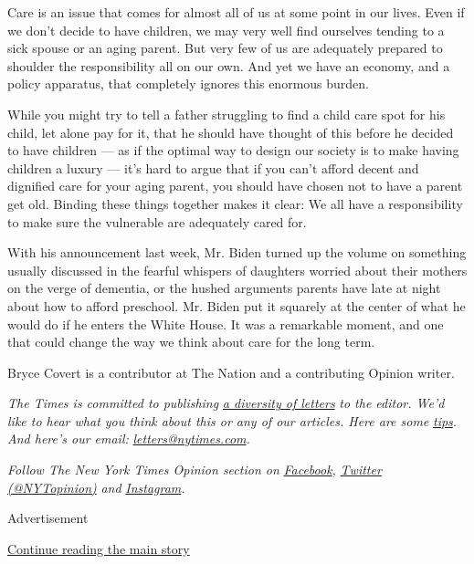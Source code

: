 Care is an issue that comes for almost all of us at some point in our
lives. Even if we don't decide to have children, we may very well find
ourselves tending to a sick spouse or an aging parent. But very few of
us are adequately prepared to shoulder the responsibility all on our
own. And yet we have an economy, and a policy apparatus, that completely
ignores this enormous burden.

While you might try to tell a father struggling to find a child care
spot for his child, let alone pay for it, that he should have thought of
this before he decided to have children --- as if the optimal way to
design our society is to make having children a luxury --- it's hard to
argue that if you can't afford decent and dignified care for your aging
parent, you should have chosen not to have a parent get old. Binding
these things together makes it clear: We all have a responsibility to
make sure the vulnerable are adequately cared for.

With his announcement last week, Mr. Biden turned up the volume on
something usually discussed in the fearful whispers of daughters worried
about their mothers on the verge of dementia, or the hushed arguments
parents have late at night about how to afford preschool. Mr. Biden put
it squarely at the center of what he would do if he enters the White
House. It was a remarkable moment, and one that could change the way we
think about care for the long term.

Bryce Covert is a contributor at The Nation and a contributing Opinion
writer.

\emph{The Times is committed to publishing}
\href{https://www.nytimes.com/2019/01/31/opinion/letters/letters-to-editor-new-york-times-women.html}{\emph{a
diversity of letters}} \emph{to the editor. We'd like to hear what you
think about this or any of our articles. Here are some}
\href{https://help.nytimes.com/hc/en-us/articles/115014925288-How-to-submit-a-letter-to-the-editor}{\emph{tips}}\emph{.
And here's our email:}
\href{mailto:letters@nytimes.com}{\emph{letters@nytimes.com}}\emph{.}

\emph{Follow The New York Times Opinion section on}
\href{https://www.facebook.com/nytopinion}{\emph{Facebook}}\emph{,}
\href{http://twitter.com/NYTOpinion}{\emph{Twitter (@NYTopinion)}}
\emph{and}
\href{https://www.instagram.com/nytopinion/}{\emph{Instagram}}\emph{.}

Advertisement

\protect\hyperlink{after-bottom}{Continue reading the main story}

